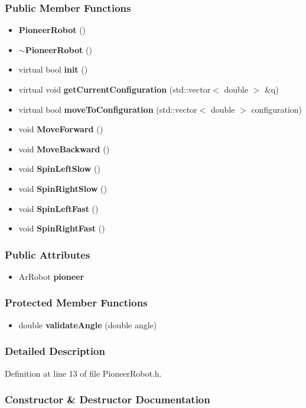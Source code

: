 \begin{appendices}
\subsubsection*{\-Public \-Member \-Functions}
\begin{itemize}
\item 
{\bf \-Pioneer\-Robot} ()
\item 
{\bf $\sim$\-Pioneer\-Robot} ()
\item 
virtual bool {\bf init} ()
\item 
virtual void {\bf get\-Current\-Configuration} (std\-::vector$<$ double $>$ \&q)
\item 
virtual bool {\bf move\-To\-Configuration} (std\-::vector$<$ double $>$ configuration)
\item 
void {\bf \-Move\-Forward} ()
\item 
void {\bf \-Move\-Backward} ()
\item 
void {\bf \-Spin\-Left\-Slow} ()
\item 
void {\bf \-Spin\-Right\-Slow} ()
\item 
void {\bf \-Spin\-Left\-Fast} ()
\item 
void {\bf \-Spin\-Right\-Fast} ()
\end{itemize}
\subsubsection*{\-Public \-Attributes}
\begin{itemize}
\item 
\-Ar\-Robot {\bf pioneer}
\end{itemize}
\subsubsection*{\-Protected \-Member \-Functions}
\begin{itemize}
\item 
double {\bf validate\-Angle} (double angle)
\end{itemize}


\subsubsection{\-Detailed \-Description}


\-Definition at line 13 of file \-Pioneer\-Robot.\-h.



\subsubsection{\-Constructor \& \-Destructor \-Documentation}

\end{appendices}
